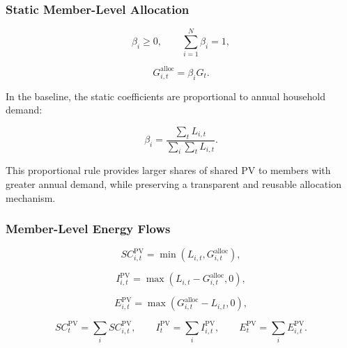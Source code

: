 \subsubsection{Static Member-Level Allocation}
\label{subsec:static_member_allocation_pv_only}

\begin{equation}
\label{eq:beta_condition}
\beta_i \geq 0, \qquad \sum_{i=1}^{N} \beta_i = 1,
\end{equation}

\begin{equation}
\label{eq:allocated_pv}
G^{\mathrm{alloc}}_{i,t} = \beta_i G_t.
\end{equation}

In the baseline, the static coefficients are proportional to annual household demand:

\begin{equation}
\label{eq:beta_annual_demand}
\beta_i = \frac{\sum_t L_{i,t}}{\sum_i \sum_t L_{i,t}}.
\end{equation}

This proportional rule provides larger shares of shared PV to members with greater annual demand, while preserving a transparent and reusable allocation mechanism.

\subsubsection{Member-Level Energy Flows}
\label{subsec:member_level_energy_flows_pv_only}

\begin{equation}
\label{eq:pv_self_consumption_member}
SC^{\mathrm{PV}}_{i,t} = \min\left(L_{i,t}, G^{\mathrm{alloc}}_{i,t}\right),
\end{equation}

\begin{equation}
\label{eq:pv_import_member}
I^{\mathrm{PV}}_{i,t} = \max\left(L_{i,t} - G^{\mathrm{alloc}}_{i,t}, 0\right),
\end{equation}

\begin{equation}
\label{eq:pv_export_member}
E^{\mathrm{PV}}_{i,t} = \max\left(G^{\mathrm{alloc}}_{i,t} - L_{i,t}, 0\right),
\end{equation}

\begin{equation}
\label{eq:pv_aggregated_flows}
SC^{\mathrm{PV}}_t = \sum_i SC^{\mathrm{PV}}_{i,t}, \qquad I^{\mathrm{PV}}_t = \sum_i I^{\mathrm{PV}}_{i,t}, \qquad E^{\mathrm{PV}}_t = \sum_i E^{\mathrm{PV}}_{i,t}.
\end{equation}

